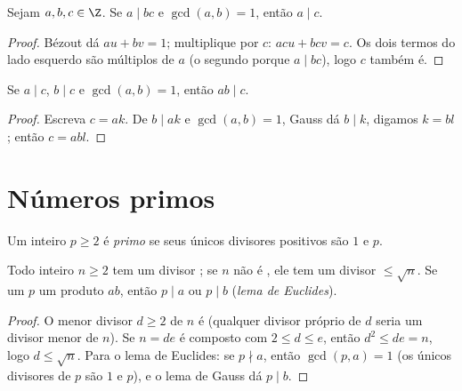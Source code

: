 \begin{theorem}\label{thm:g12:arith:gauss}
Sejam $a, b, c \in \Z$. Se $a \mid bc$ e $\gcd(a, b) = 1$, então
$a \mid c$.
\end{theorem}

\begin{proof}
Bézout dá $au + bv = 1$; multiplique por $c$: $acu + bcv = c$. Os dois
termos do lado esquerdo são múltiplos de $a$ (o segundo porque
$a \mid bc$), logo $c$ também é.
\end{proof}

\begin{corollary}\label{cor:g12:arith:coprimeprod}
Se $a \mid c$, $b \mid c$ e $\gcd(a,b) = 1$, então $ab \mid c$.
\end{corollary}

\begin{proof}
Escreva $c = ak$. De $b \mid ak$ e $\gcd(a,b)=1$, Gauss dá $b \mid k$,
digamos $k = bl$; então $c = abl$.
\end{proof}

\section{Números primos}

\begin{definition}[Primo]\label{def:g12:arith:prime}
Um inteiro $p \geq 2$ é \emph{primo} se seus únicos
divisores positivos são $1$ e $p$.
\end{definition}

\begin{proposition}\label{prop:g12:arith:primedivides}
Todo inteiro $n \geq 2$ tem um divisor ; se $n$ não é , ele tem
um divisor  $\leq \sqrt n$. Se um  $p$  um produto $ab$,
então $p \mid a$ ou $p \mid b$ (\emph{lema de Euclides}).
\end{proposition}

\begin{proof}
O menor divisor $d \geq 2$ de $n$ é  (qualquer divisor próprio de $d$
seria um divisor menor de $n$). Se $n = de$ é composto com
$2 \leq d \leq e$, então $d^2 \leq de = n$, logo $d \leq \sqrt n$. Para o
lema de Euclides: se $p \nmid a$, então $\gcd(p, a) = 1$ (os únicos
divisores de $p$ são $1$ e $p$), e o lema de Gauss dá $p \mid b$.
\end{proof}

